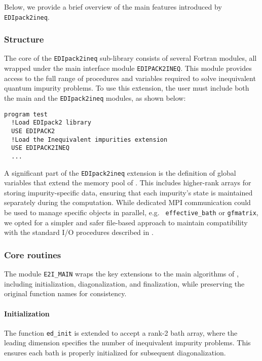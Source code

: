 \documentclass[edipack2.tex]{subfiles}
\begin{document}
Below, we provide a brief overview of the main features introduced by 
{\tt EDIpack2ineq}.

\subsubsection{Structure}\label{ssSecIneqStructure}
The core of the {\tt EDIpack2ineq} sub-library consists of several 
Fortran modules, all wrapped under the main interface module 
{\tt EDIPACK2INEQ}. This module provides access to the full range of 
procedures and variables required to solve inequivalent quantum 
impurity problems. To use this extension, the user must include both 
the main \NAME and the {\tt EDIpack2ineq} modules, as shown below:
\begin{lstlisting}[style=fstyle,numbers=none,basicstyle={\scriptsize\ttfamily}]
program test
  !Load EDIpack2 library 
  USE EDIPACK2 
  !Load the Inequivalent impurities extension
  USE EDIPACK2INEQ
  ...
\end{lstlisting}

A significant part of the {\tt EDIpack2ineq} extension is the 
definition of global variables that extend the memory pool of 
\NAME. This includes higher-rank arrays for storing impurity-specific 
data, ensuring that each impurity's state is maintained separately 
during the computation. While dedicated MPI communication could be 
used to manage specific objects in parallel, e.g. {\tt
  effective\_bath} or {\tt gfmatrix}, we opted for a simpler and safer  
file-based approach to maintain compatibility with the standard I/O 
procedures described in .


\subsubsection{Core routines}\label{ssSecIneqGlobal}
The module {\tt E2I\_MAIN} wraps the key extensions to the main 
algorithms of \NAME, including initialization, diagonalization, and 
finalization, while preserving the original function names for 
consistency. 

\paragraph{\bf Initialization} The function {\tt ed\_init} is extended to 
  accept a rank-2 bath array, where the leading dimension specifies 
  the number of inequivalent impurity problems. This ensures each bath 
  is properly initialized for subsequent diagonalization.
\end{document}
